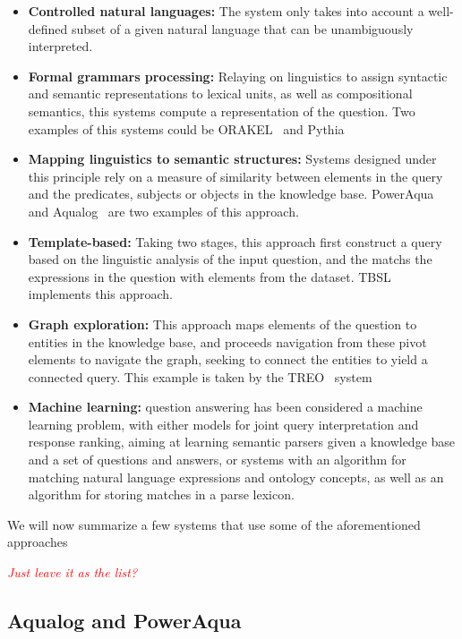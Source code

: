 \begin{itemize}
  \item \textbf{Controlled natural languages:} The system only takes into account a well-defined subset of a given natural language that can be unambiguously interpreted.
  \item \textbf{Formal grammars processing:} Relaying on linguistics to assign syntactic and semantic representations to lexical units, as well as compositional semantics, this systems compute a representation of the question. Two examples of this systems could be ORAKEL~\cite{cimiano2008towards} and Pythia~\cite{unger2011pythia}
  \item \textbf{Mapping linguistics to semantic structures:} Systems designed under this principle rely on a measure of similarity between elements in the query and the predicates, subjects or objects in the knowledge base. PowerAqua~\cite{lopez2011poweraqua} and Aqualog~\cite{lopez2007aqualog} are two examples of this approach.
  \item \textbf{Template-based:} Taking two stages, this approach first construct a query based on the linguistic analysis of the input question, and the matchs the expressions in the question with elements from the dataset. TBSL~\cite{unger2012template} implements this approach.
  \item \textbf{Graph exploration:} This approach maps elements of the question to entities in the knowledge base, and proceeds navigation from these pivot elements to navigate the graph, seeking to connect the entities to yield a connected query. This example is taken by the TREO~\cite{freitas2011querying} system
  \item \textbf{Machine learning:} question answering has been considered a machine learning problem, with either models for joint query interpretation and response ranking, aiming at learning semantic parsers given a knowledge base and a set of questions and answers, or systems with an algorithm for matching natural language expressions and ontology concepts, as well as an algorithm for storing matches in a parse lexicon.
\end{itemize}

We will now summarize a few systems that use some of the aforementioned approaches

\emph{\textcolor{red}{Just leave it as the list?}}

\subsection{Aqualog and PowerAqua}

